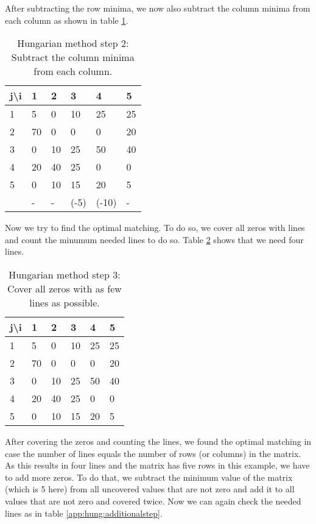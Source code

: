 After subtracting the row minima, we now also subtract the column minima from each column as shown in table \ref{app:hung:step2}.

\begin{table}[h]
    \centering
    \begin{tabular}{|l | l l l l l |}
    \hline
    j\textbackslash i & 1 & 2 & 3 & 4 & 5\\ \hline
    1 & 5 & 0 & 10 & 25 & 25\\
    2 & 70 & 0 & 0 & 0 & 20\\
    3 & 0 & 10 & 25 & 50 & 40\\
    4 & 20 & 40 & 25 & 0 & 0\\
    5 & 0 & 10 & 15 & 20 & 5\\ \hline
    & - & - & (-5) & (-10) & -\\ \hline
    \end{tabular}
    \caption{Hungarian method step 2: Subtract the column minima from each column.}
    \label{app:hung:step2}
\end{table}

Now we try to find the optimal matching. To do so, we cover all zeros with lines and count the minumum needed lines to do so. Table \ref{app:hung:step3} shows that we need four lines.

\begin{table}[h]
    \centering
    \begin{tabular}{|l | l l l l l |}
    \hline
    j\textbackslash i & 1 & 2 & 3 & 4 & 5\\ \hline
    1 & \cellcolor{orange!25}5 & \cellcolor{orange!50}0 & 10 & 25 & 25\\
    2 & \cellcolor{orange!75}70 & \cellcolor{orange!75}0 & \cellcolor{orange!75}0 & \cellcolor{orange!75}0 & \cellcolor{orange!75}20\\
    3 & \cellcolor{orange!25}0 & \cellcolor{orange!50}10 & 25 & 50 & 40\\
    4 & \cellcolor{orange!75}20 & \cellcolor{orange!75}40 & \cellcolor{orange!75}25 & \cellcolor{orange!75}0 & \cellcolor{orange!75}0\\
    5 & \cellcolor{orange!25}0 & \cellcolor{orange!50}10 & 15 & 20 & 5\\ \hline
    \end{tabular}
    \caption{Hungarian method step 3: Cover all zeros with as few lines as possible.}
    \label{app:hung:step3}
\end{table}

After covering the zeros and counting the lines, we found the optimal matching in case the number of lines equals the number of rows (or columns) in the matrix. As this results in four lines and the matrix has five rows in this example, we have to add more zeros. To do that, we subtract the minimum value of the matrix (which is 5 here) from all uncovered values that are not zero and add it to all values that are not zero and covered twice. Now we can again check the needed lines as in table \ref{app:hung:additionalstep}.

